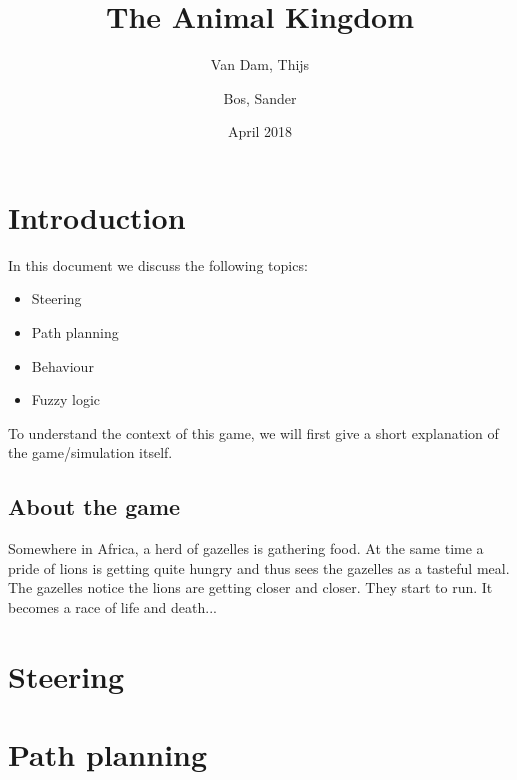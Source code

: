 \documentclass[11pt]{article}
\author{Van Dam, Thijs\\
\and
Bos, Sander\\
}
\title{\huge The Animal Kingdom}
\date{April 2018}
\begin{document}
    \maketitle
    \thispagestyle{empty}
    \newpage
    \newpage
    \setcounter{page}{1}
    \section{Introduction}\label{sec:introduction}
    In this document we discuss the following topics:
    \begin{itemize}
        \item Steering
        \item Path planning
        \item Behaviour
        \item Fuzzy logic
    \end{itemize}
    
    To understand the context of this game, we will first give a short explanation of the game/simulation itself.
    
    \subsection*{About the game}\label{subsec:about}
    Somewhere in Africa, a herd of gazelles is gathering food.
    At the same time a pride of lions is getting quite hungry and thus sees the gazelles as a tasteful meal.
    The gazelles notice the lions are getting closer and closer.
    They start to run.
    It becomes a race of life and death...

    \newpage
    \tableofcontents
    
    \newpage
    \section{Steering}\label{sec:steering}

    \newpage
    \section{Path planning}\label{sec:pathPlanning}
    

    \newpage
\end{document}
